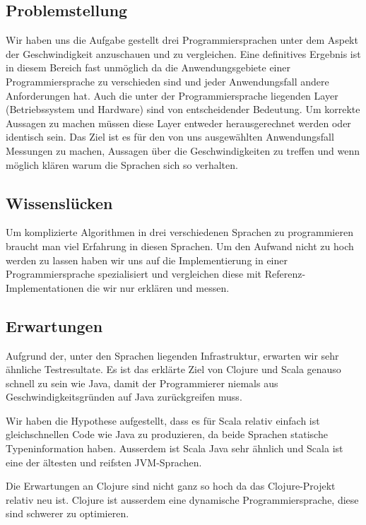 \documentclass{fancydocument}
\begin{document}
\subsection{Problemstellung}

Wir haben uns die Aufgabe gestellt drei Programmiersprachen unter dem
Aspekt der Geschwindigkeit anzuschauen und zu vergleichen. Eine
definitives Ergebnis ist in diesem Bereich fast unmöglich da die
Anwendungsgebiete einer Programmiersprache zu verschieden sind und
jeder Anwendungsfall andere Anforderungen hat. Auch die
unter der Programmiersprache liegenden Layer (Betriebssystem und
Hardware) sind von entscheidender Bedeutung. Um korrekte Aussagen zu
machen m\"ussen diese Layer entweder herausgerechnet werden oder
identisch sein. Das Ziel ist es f\"ur den von uns ausgew\"ahlten Anwendungsfall Messungen
zu machen, Aussagen \"uber die Geschwindigkeiten zu treffen und
wenn m\"oglich kl\"aren warum die Sprachen sich so verhalten.

\subsection{Wissenslücken}

Um komplizierte Algorithmen in drei verschiedenen Sprachen zu
programmieren braucht man viel Erfahrung in diesen Sprachen. Um den
Aufwand nicht zu hoch werden zu lassen haben wir uns auf die
Implementierung in einer Programmiersprache spezialisiert und
vergleichen diese mit Referenz-Implementationen die wir nur erklären
und messen.

\subsection{Erwartungen}

Aufgrund der, unter den Sprachen liegenden Infrastruktur, erwarten wir sehr
\"ahnliche Testresultate. Es ist das erkl\"arte Ziel von Clojure und
Scala genauso schnell zu sein wie Java, damit der Programmierer niemals aus Geschwindigkeitsgründen auf Java zurückgreifen muss.

Wir haben die Hypothese aufgestellt, dass es für Scala relativ einfach ist
gleichschnellen Code wie Java zu produzieren, da beide Sprachen 
statische Typeninformation haben. Ausserdem ist Scala Java sehr ähnlich
und Scala ist eine der \"altesten und reifsten JVM-Sprachen.

Die Erwartungen an Clojure sind nicht ganz so hoch da das Clojure-Projekt relativ neu ist. Clojure 
ist ausserdem eine dynamische Programmiersprache, diese sind schwerer zu optimieren.
\end{document}
